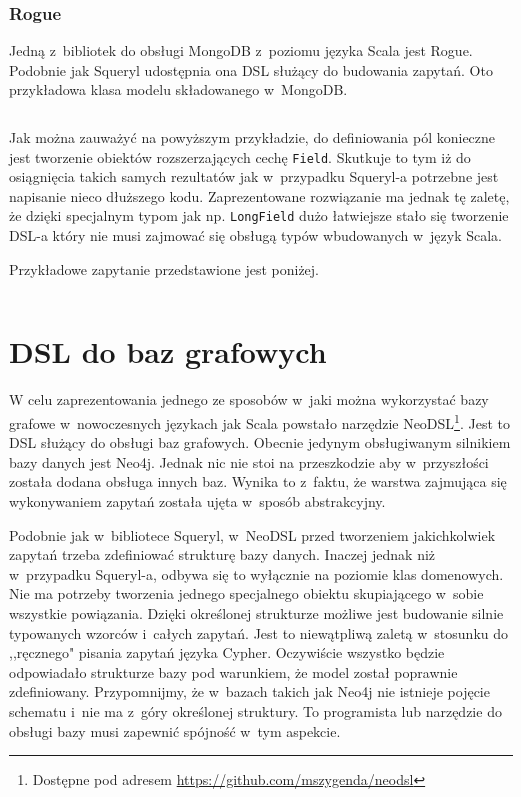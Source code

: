 \documentclass{xmgr}
\begin{document}
\subsection{Rogue}

Jedną z~bibliotek do obsługi MongoDB z~poziomu języka Scala jest Rogue. Podobnie jak Squeryl udostępnia ona DSL służący do budowania zapytań. Oto przykładowa klasa modelu składowanego w~MongoDB.

\inputminted{scala}{listings/scala/rogue-model.scala}

Jak można zauważyć na powyższym przykładzie, do definiowania pól konieczne jest tworzenie obiektów rozszerzających cechę \texttt{Field}. Skutkuje to tym iż do osiągnięcia takich samych rezultatów jak w~przypadku Squeryl-a potrzebne jest napisanie nieco dłuższego kodu. Zaprezentowane rozwiązanie ma jednak tę zaletę, że dzięki specjalnym typom jak np. \texttt{LongField} dużo łatwiejsze stało się tworzenie DSL-a który nie musi zajmować się obsługą typów wbudowanych w~język Scala.

\medskip\noindent Przykładowe zapytanie przedstawione jest poniżej.

\inputminted{scala}{listings/scala/rogue-query.scala}

\chapter{DSL do baz grafowych}

W celu zaprezentowania jednego ze sposobów w~jaki można wykorzystać bazy grafowe w~nowoczesnych językach jak Scala powstało narzędzie NeoDSL\footnote{Dostępne pod adresem \url{https://github.com/mszygenda/neodsl}}. Jest to DSL służący do obsługi baz grafowych.
Obecnie jedynym obsługiwanym silnikiem bazy danych jest Neo4j. Jednak nic nie stoi na przeszkodzie aby w~przyszłości została dodana obsługa innych baz. Wynika to z~faktu, że warstwa zajmująca się wykonywaniem zapytań została ujęta w~sposób abstrakcyjny.

Podobnie jak w~bibliotece Squeryl, w~NeoDSL przed tworzeniem jakichkolwiek zapytań trzeba zdefiniować strukturę bazy danych. Inaczej jednak niż w~przypadku Squeryl-a, odbywa się to wyłącznie na poziomie klas domenowych. Nie ma potrzeby tworzenia jednego specjalnego obiektu skupiającego w~sobie wszystkie powiązania. Dzięki określonej strukturze możliwe jest budowanie silnie typowanych wzorców i~całych zapytań. Jest to niewątpliwą zaletą w~stosunku do ,,ręcznego" pisania zapytań języka Cypher. Oczywiście wszystko będzie odpowiadało strukturze bazy pod warunkiem, że model został poprawnie zdefiniowany. Przypomnijmy, że w~bazach takich jak Neo4j nie istnieje pojęcie schematu i~nie ma z~góry określonej struktury. To programista lub narzędzie do obsługi bazy musi zapewnić spójność w~tym aspekcie.
\end{document}
